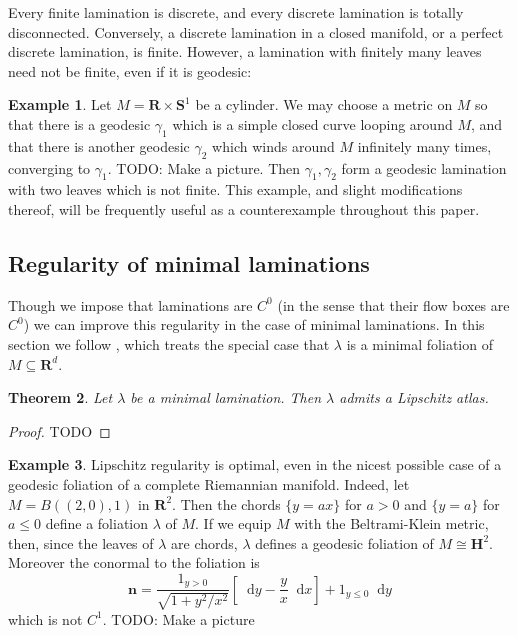 \documentclass[reqno,10pt]{amsart}
\newcommand{\RR}{\mathbf{R}}
\newcommand{\Hyp}{\mathbf H}
\newcommand{\Sph}{\mathbf S}
\newcommand*\dif{\mathop{}\!\mathrm{d}}
\newcommand{\normal}{\mathbf n}
\newtheorem{theorem}{Theorem}[section]
\theoremstyle{definition}
\newtheorem{example}[theorem]{Example}
\numberwithin{equation}{section}
\begin{document}
Every finite lamination is discrete, and every discrete lamination is totally disconnected.
Conversely, a discrete lamination in a closed manifold, or a perfect discrete lamination, is finite.
However, a lamination with finitely many leaves need not be finite, even if it is geodesic:

\begin{example}\label{two geodesics}
Let $M = \RR \times \Sph^1$ be a cylinder.
We may choose a metric on $M$ so that there is a geodesic $\gamma_1$ which is a simple closed curve looping around $M$, and that there is another geodesic $\gamma_2$ which winds around $M$ infinitely many times, converging to $\gamma_1$.
TODO: Make a picture.
Then $\gamma_1, \gamma_2$ form a geodesic lamination with two leaves which is not finite.
This example, and slight modifications thereof, will be frequently useful as a counterexample throughout this paper.
\end{example}




\subsection{Regularity of minimal laminations}\label{RegularitySec}
Though we impose that laminations are $C^0$ (in the sense that their flow boxes are $C^0$) we can improve this regularity in the case of minimal laminations.
In this section we follow \cite{Solomon86}, which treats the special case that $\lambda$ is a minimal foliation of $M \subseteq \RR^d$.

\begin{theorem}\label{regularity theorem}
Let $\lambda$ be a minimal lamination. Then $\lambda$ admits a Lipschitz atlas.
\end{theorem}
\begin{proof}
TODO
\end{proof}

\begin{example}
Lipschitz regularity is optimal, even in the nicest possible case of a geodesic foliation of a complete Riemannian manifold.
Indeed, let $M = B((2, 0), 1)$ in $\RR^2$. Then the chords $\{y = ax\}$ for $a > 0$ and $\{y = a\}$ for $a \leq 0$ define a foliation $\lambda$ of $M$.
If we equip $M$ with the Beltrami-Klein metric, then, since the leaves of $\lambda$ are chords, $\lambda$ defines a geodesic foliation of $M \cong \Hyp^2$.
Moreover the conormal to the foliation is
$$\normal = \frac{1_{y > 0}}{\sqrt{1 + y^2/x^2}} \left[\dif y - \frac{y}{x} \dif x\right] + 1_{y \leq 0} \dif y$$
which is not $C^1$.
TODO: Make a picture
\end{example}
\end{document}
